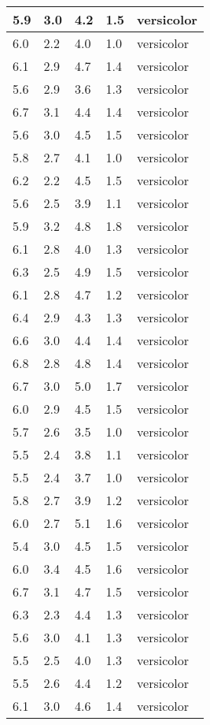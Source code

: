 \begin{table}
\begin{tabular}{|l|l|l|l|l|}
5.9 & 3.0 & 4.2 & 1.5 & versicolor \\ \hline
6.0 & 2.2 & 4.0 & 1.0 & versicolor \\ \hline
6.1 & 2.9 & 4.7 & 1.4 & versicolor \\ \hline
5.6 & 2.9 & 3.6 & 1.3 & versicolor \\ \hline
6.7 & 3.1 & 4.4 & 1.4 & versicolor \\ \hline
5.6 & 3.0 & 4.5 & 1.5 & versicolor \\ \hline
5.8 & 2.7 & 4.1 & 1.0 & versicolor \\ \hline
6.2 & 2.2 & 4.5 & 1.5 & versicolor \\ \hline
5.6 & 2.5 & 3.9 & 1.1 & versicolor \\ \hline
5.9 & 3.2 & 4.8 & 1.8 & versicolor \\ \hline
6.1 & 2.8 & 4.0 & 1.3 & versicolor \\ \hline
6.3 & 2.5 & 4.9 & 1.5 & versicolor \\ \hline
6.1 & 2.8 & 4.7 & 1.2 & versicolor \\ \hline
6.4 & 2.9 & 4.3 & 1.3 & versicolor \\ \hline
6.6 & 3.0 & 4.4 & 1.4 & versicolor \\ \hline
6.8 & 2.8 & 4.8 & 1.4 & versicolor \\ \hline
6.7 & 3.0 & 5.0 & 1.7 & versicolor \\ \hline
6.0 & 2.9 & 4.5 & 1.5 & versicolor \\ \hline
5.7 & 2.6 & 3.5 & 1.0 & versicolor \\ \hline
5.5 & 2.4 & 3.8 & 1.1 & versicolor \\ \hline
5.5 & 2.4 & 3.7 & 1.0 & versicolor \\ \hline
5.8 & 2.7 & 3.9 & 1.2 & versicolor \\ \hline
6.0 & 2.7 & 5.1 & 1.6 & versicolor \\ \hline
5.4 & 3.0 & 4.5 & 1.5 & versicolor \\ \hline
6.0 & 3.4 & 4.5 & 1.6 & versicolor \\ \hline
6.7 & 3.1 & 4.7 & 1.5 & versicolor \\ \hline
6.3 & 2.3 & 4.4 & 1.3 & versicolor \\ \hline
5.6 & 3.0 & 4.1 & 1.3 & versicolor \\ \hline
5.5 & 2.5 & 4.0 & 1.3 & versicolor \\ \hline
5.5 & 2.6 & 4.4 & 1.2 & versicolor \\ \hline
6.1 & 3.0 & 4.6 & 1.4 & versicolor \\ \hline

\end{tabular}
\end{table}
